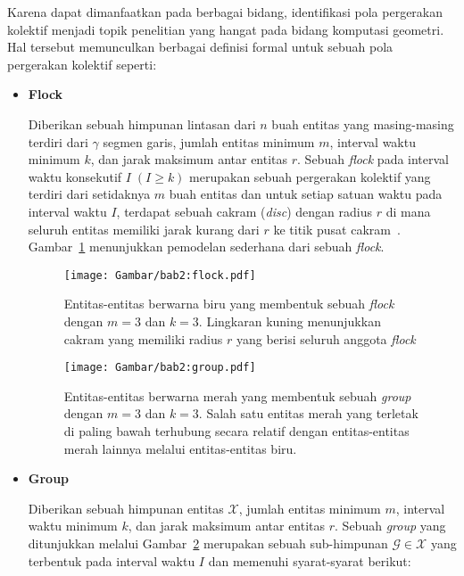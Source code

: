 Karena dapat dimanfaatkan pada berbagai bidang, identifikasi pola pergerakan kolektif menjadi topik penelitian yang hangat pada bidang komputasi geometri. Hal tersebut memunculkan berbagai definisi formal untuk sebuah pola pergerakan kolektif seperti:

\clearpage

\begin{itemize}
    \item \textbf{Flock}
    
    Diberikan sebuah himpunan lintasan dari $n$ buah entitas yang masing-masing terdiri dari $\gamma$ segmen garis, jumlah entitas minimum $m$, interval waktu minimum $k$, dan jarak maksimum antar entitas $r$. Sebuah \textit{flock} pada interval waktu konsekutif $I\;(I \geq k)$ merupakan sebuah pergerakan kolektif yang terdiri dari setidaknya $m$ buah entitas dan untuk setiap satuan waktu pada interval waktu $I$, terdapat sebuah cakram (\textit{disc}) dengan radius $r$ di mana seluruh entitas memiliki jarak kurang dari $r$ ke titik pusat cakram~\cite{gudmundsson:flock}. Gambar~\ref{bab2:flock} menunjukkan pemodelan sederhana dari sebuah \textit{flock}.
    
    \begin{figure}[h]
        \centering
        \captionsetup{width=0.75\textwidth}
        \texttt{[image: Gambar/bab2:flock.pdf]}
        \caption[Sebuah \textit{flock}]{Entitas-entitas berwarna biru yang membentuk sebuah \textit{flock} dengan $m = 3$ dan $k = 3$. Lingkaran kuning menunjukkan cakram yang memiliki radius $r$ yang berisi seluruh anggota \textit{flock}}
        \label{bab2:flock}
    \end{figure}
    
\begin{figure}[h]
    \centering
    \captionsetup{width=0.75\textwidth}
    \texttt{[image: Gambar/bab2:group.pdf]}
    \caption[Sebuah \textit{group}]{Entitas-entitas berwarna merah yang membentuk sebuah \textit{group} dengan $m = 3$ dan $k = 3$. Salah satu entitas merah yang terletak di paling bawah terhubung secara relatif dengan entitas-entitas merah lainnya melalui entitas-entitas biru.}
    \label{bab2:group}
\end{figure}

    \item \textbf{Group}
    
    Diberikan sebuah himpunan entitas $\mathcal{X}$, jumlah entitas minimum $m$, interval waktu minimum $k$, dan jarak maksimum antar entitas $r$. Sebuah \textit{group} yang ditunjukkan melalui Gambar~\ref{bab2:group} merupakan sebuah sub-himpunan $\mathcal{G} \in \mathcal{X}$ yang terbentuk pada interval waktu $I$ dan memenuhi syarat-syarat berikut:
    

\end{itemize}
